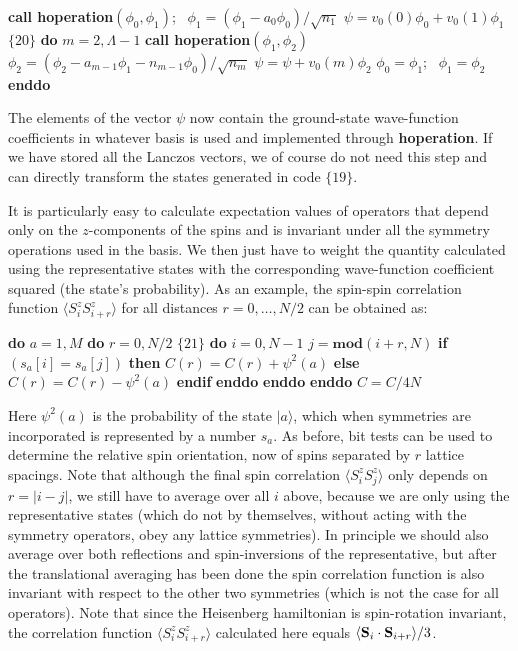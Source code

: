 \documentclass[draft,numberedheadings]{aipproc}
\newcommand{\code}{\null\vskip-2mm\noindent}
\newcommand{\br}{\hfill\break}
\newcommand{\cia}{\null\hskip5mm}
\newcommand{\cib}{\null\hskip10mm}
\newcommand{\cic}{\null\hskip15mm}
\newcommand{\cid}{\null\hskip20mm}
\newcommand{\cie}{\null\hskip25mm}
\begin{document}
{\code
\cia    {\bf call hoperation}$(\phi_0,\phi_1)$;~ $\phi_1=(\phi_1-a_{0}\phi_0)/\sqrt{n_1}$ \br
\cia    $\psi=v_0(0)\phi_0+v_0(1)\phi_1$ \hfill $\{20\}$\break 
\cia    {\bf do} $m=2,\Lambda-1$  \br                     
\cib       {\bf call hoperation}$(\phi_1,\phi_2)$ \br
\cib       $\phi_2=(\phi_2-a_{m-1}\phi_1-n_{m-1}\phi_0)/\sqrt{n_m}$ \br
\cib       $\psi=\psi+v_0(m)\phi_2$ \br
\cib       $\phi_0=\phi_1$;~ $\phi_1=\phi_2$ \br
\cia    {\bf enddo} 
\code}

\noindent
The elements of the vector $\psi$ now contain the ground-state wave-function coefficients in whatever basis is used and implemented through 
{\bf hoperation}. If we have stored all the Lanczos vectors, we of course do not need this step and can directly transform the states generated 
in code $\{19\}$.

It is particularly easy to calculate expectation values of operators that depend only on the $z$-components of the spins and is invariant under 
all the symmetry operations used in the basis. We then just have to weight the quantity calculated using the representative states with 
the corresponding wave-function coefficient squared (the state's probability). As an example, the spin-spin correlation function 
$\langle S^z_{i}S^z_{i+r}\rangle$ for all distances $r=0,\ldots,N/2$ can be obtained as:

{\code
\cia    {\bf do} $a=1,M$   \br 
\cib       {\bf do} $r=0,N/2$                       \hfill $\{21\}$\break 
\cic          {\bf do} $i=0,N-1$   \br 
\cid              $j=\mathbf{mod}(i+r,N)$ \br
\cid              {\bf if} $(s_a[i]=s_a[j])$ {\bf then} \br 
\cie                 $C(r)=C(r)+\psi^2(a)$ \br
\cid             {\bf else} \br
\cie                 $C(r)=C(r)-\psi^2(a)$ \br
\cid             {\bf endif}   \br 
\cic          {\bf enddo} \br 
\cib       {\bf enddo}  \br
\cia    {\bf enddo}  \br
\cia    $C=C/4N$
\code}

\noindent
Here $\psi^2(a)$ is the probability of the state $|a\rangle$, which when symmetries are incorporated is represented by a number $s_a$. As before, bit tests  
can be used to determine the relative spin orientation, now of spins separated by $r$ lattice spacings. Note that although the final spin correlation 
$\langle S^z_iS^z_j\rangle$ only depends on $r=|i-j|$, we still have to average over all $i$ above, because we are only using the representative states 
(which do not by themselves, without acting with the symmetry operators, obey any lattice symmetries). In principle we should also average over both 
reflections and spin-inversions of the representative, but after the translational averaging has been done the spin correlation function is also
invariant with respect to the other two symmetries (which is not the case for all operators). Note that since the Heisenberg hamiltonian is spin-rotation 
invariant, the correlation function $\langle S^z_{i}S^z_{i+r}\rangle$ calculated here equals $\langle {\bf S}_{i}\cdot {\bf S}_{i+r}\rangle/3$.
\end{document}
